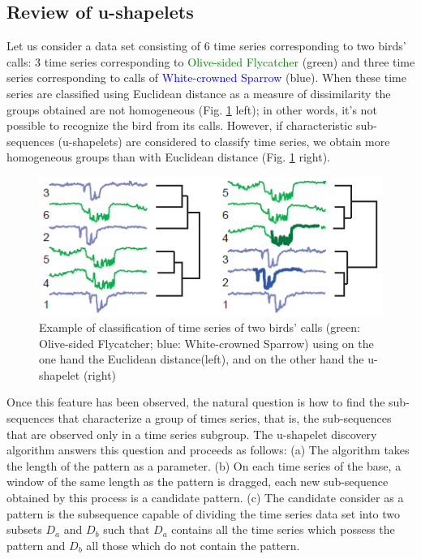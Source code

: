 \subsection{Review of u-shapelets}


Let us consider a data set consisting of 6 time series corresponding to two birds' calls: 3 time series corresponding to \textcolor{green}{Olive-sided Flycatcher} (green) and three time series corresponding to calls of \textcolor{blue}{White-crowned Sparrow} (blue). When these time series are classified using Euclidean distance as a measure of dissimilarity  the groups obtained are not homogeneous (Fig. \ref{US} left); in other words, it's not possible to recognize the bird from its calls. However, if  characteristic sub-sequences (u-shapelets) are considered  to classify time series, we obtain more homogeneous groups than with Euclidean distance (Fig. \ref{US} right).
  
 \begin{figure}[h]
  \centering
  \includegraphics[scale=0.65]{images/exemple_shapelet}
    \caption{Example of classification of time series of two birds' calls (green: Olive-sided Flycatcher; blue: White-crowned Sparrow) using on the one hand the Euclidean distance(left), and on the other hand the u-shapelet (right) \cite{ulanova2015scalable}}
  \label{US}
 \end{figure}
 

Once this feature has been observed, the natural question is how to find the sub-sequences that characterize a group of times series, that is, the sub-sequences that are observed only in a time series subgroup. The u-shapelet discovery algorithm answers this question and proceeds as follows: 
(a) The algorithm takes the length of the pattern as a parameter. (b)
On each time series of the base, a window of the same length as the pattern is dragged, each new sub-sequence obtained by this process is a candidate pattern. (c) The candidate consider as a pattern is the subsequence capable of dividing the time series data set into two subsets $D_a$ and $D_b$ such that $D_a$ contains all the time series which possess the pattern and $D_b$ all those which do not contain the pattern. 


